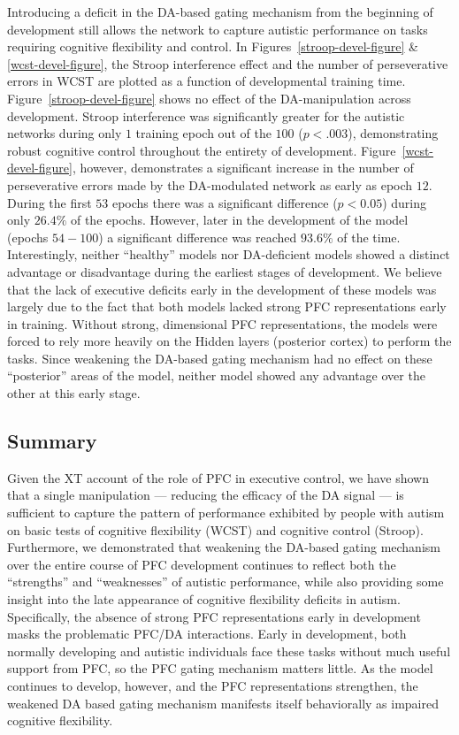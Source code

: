 Introducing a deficit in the DA-based gating mechanism from the
beginning of development still allows the network to capture autistic
performance on tasks requiring cognitive flexibility and control.  In
Figures~\ref{stroop-devel-figure} \& \ref{wcst-devel-figure}, the
Stroop interference effect and the number of perseverative errors in
WCST are plotted as a function of developmental training time.
Figure~\ref{stroop-devel-figure} shows no effect of the
DA-manipulation across development.  Stroop interference was
significantly greater for the autistic networks during only $1$ training epoch
out of the $100$ ($p<.003$), demonstrating robust cognitive control
throughout the entirety of development.
Figure~\ref{wcst-devel-figure}, however, demonstrates a significant
increase in the number of perseverative errors made by the
DA-modulated network as early as epoch $12$.  During the first $53$
epochs there was a significant difference ($p < 0.05$) during only
$26.4\%$ of the epochs.  However, later in the development of the
model (epochs $54-100$) a significant difference was reached $93.6\%$
of the time.  Interestingly, neither ``healthy'' models nor
DA-deficient models showed a distinct advantage or disadvantage during
the earliest stages of development.  We believe that the lack of
executive deficits early in the development of these models was
largely due to the fact that both models lacked strong PFC
representations early in training.  Without strong, dimensional PFC
representations, the models were forced to rely more heavily on the
Hidden layers (posterior cortex) to perform the tasks.  Since
weakening the DA-based gating mechanism had no effect on these
``posterior'' areas of the model, neither model showed any advantage
over the other at this early stage.

\subsection{Summary}

Given the XT account of the role of PFC in executive control, we have shown that a single manipulation --- reducing the efficacy of the DA signal --- is sufficient to capture the pattern of performance exhibited by people with autism on basic tests of cognitive flexibility (WCST) and cognitive control (Stroop).  Furthermore, we demonstrated that weakening the DA-based gating mechanism over the entire course of PFC development continues to reflect both the ``strengths'' and ``weaknesses'' of autistic performance, while also providing some insight into the late appearance of cognitive flexibility deficits in autism.  Specifically, the absence of strong PFC representations early in development masks the problematic PFC/DA interactions.  Early in development, both normally developing and autistic individuals face these tasks without much useful support from PFC, so the PFC gating mechanism matters little.  As the model continues to develop, however, and the PFC representations strengthen, the weakened DA based gating mechanism manifests itself behaviorally as impaired cognitive flexibility.

